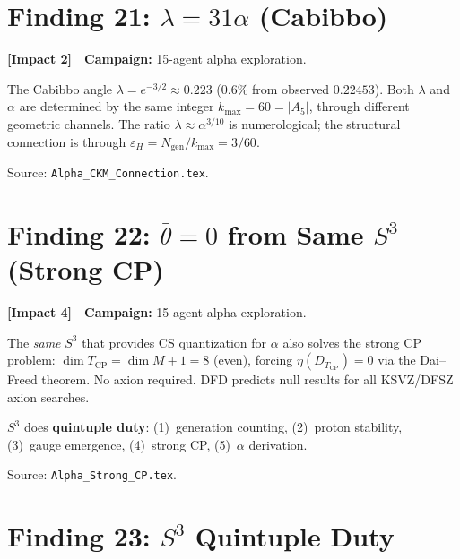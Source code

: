 \documentclass[11pt,a4paper]{article}
\newcommand{\impactfour}{\textcolor{impact4}{\textbf{[Impact 4]}}}
\newcommand{\impacttwo}{\textcolor{impact2}{\textbf{[Impact 2]}}}
\begin{document}
\section{Finding 21: $\lambda = 31\alpha$ (Cabibbo)}
\label{sec:cabibbo}

\impacttwo\ \ \textbf{Campaign:} 15-agent alpha exploration.

The Cabibbo angle $\lambda = e^{-3/2} \approx 0.223$ (0.6\% from observed
$0.22453$). Both $\lambda$ and $\alpha$ are determined by the same integer
$k_{\max} = 60 = |A_5|$, through different geometric channels. The ratio
$\lambda \approx \alpha^{3/10}$ is numerological; the structural connection
is through $\varepsilon_H = N_{\mathrm{gen}}/k_{\max} = 3/60$.

Source: \texttt{Alpha\_CKM\_Connection.tex}.


\section{Finding 22: $\bar\theta = 0$ from Same $S^3$ (Strong CP)}
\label{sec:strong-CP}

\impactfour\ \ \textbf{Campaign:} 15-agent alpha exploration.

The \emph{same} $S^3$ that provides CS quantization for $\alpha$ also
solves the strong CP problem: $\dim T_{\mathrm{CP}} = \dim M + 1 = 8$
(even), forcing $\eta(D_{T_{\mathrm{CP}}}) = 0$ via the Dai--Freed
theorem. No axion required. DFD predicts null results for all
KSVZ/DFSZ axion searches.

$S^3$ does \textbf{quintuple duty}:
(1)~generation counting, (2)~proton stability,
(3)~gauge emergence, (4)~strong CP, (5)~$\alpha$ derivation.

Source: \texttt{Alpha\_Strong\_CP.tex}.


\section{Finding 23: $S^3$ Quintuple Duty}
\label{sec:quintuple}
\end{document}
